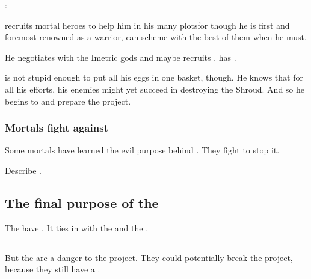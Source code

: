\Ishnaruchaefir: 

\Ishnaruchaefir recruits mortal heroes to help him in his many plots\dash for though he is first and foremost renowned as a warrior, \Ishnaruchaefir can scheme with the best of them when he must. 

He negotiates with the Imetric gods and maybe recruits . 
\Ishnaruchaefir has .

\Ishnaruchaefir is not stupid enough to put all his eggs in one basket, though.
He knows that for all his efforts, his enemies might yet succeed in destroying the Shroud.
And so he begins to  and prepare the  project. 





\subsubsection{Mortals fight against \iquin}
Some mortals have learned the evil purpose behind \iquin. 
They fight to stop it. 

Describe . 









\subsection{The final purpose of the \Sephiroth}
The  have . 
It ties in with the  and the . 







\subsection{\Kezerad}
But the  are a danger to the \Sephirah{} project. They could potentially break the project, because they still have a .

